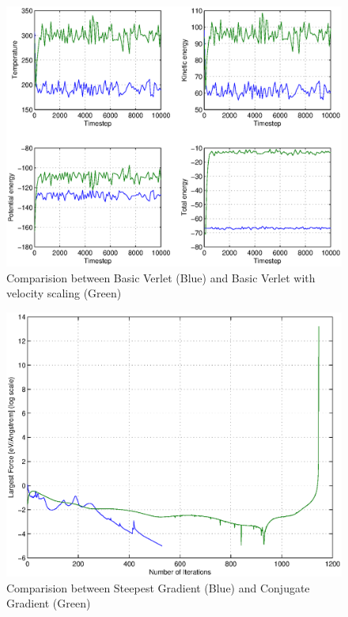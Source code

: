\documentclass{article}
\begin{document}
\begin{figure}[!h]
\centering
\includegraphics[totalheight=0.4\textheight]{partbc}
\caption{Comparision between Basic Verlet (Blue) and Basic Verlet with velocity scaling (Green) }
\label{fig:aNicePicture}
\end{figure}
\begin{figure}[!h]
\centering
\includegraphics[totalheight=0.4\textheight]{partbd}
\caption{Comparision between Steepest Gradient (Blue) and Conjugate Gradient (Green)}
\label{fig:aNicePicture}
\end{figure}
\end{document}
